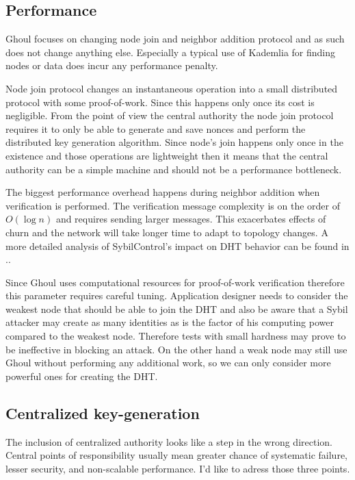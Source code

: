   \subsection{Performance}

  Ghoul focuses on changing node join and neighbor addition protocol and as
  such does not change anything else. Especially a typical use of Kademlia for
  finding nodes or data does incur any performance penalty.

  Node join protocol changes an instantaneous operation into a small distributed
  protocol with some proof-of-work. Since this happens only once its cost is
  negligible. From the point of view the central authority the node join
  protocol requires it to only be able to generate and save nonces and perform
  the distributed key generation algorithm. Since node's join happens only once
  in the existence and those operations are lightweight then it means that the
  central authority can be a simple machine and should not be a performance
  bottleneck.

  The biggest performance overhead happens during neighbor addition when
  verification is performed. The verification message complexity is on the order
  of $O(\log n)$ and requires sending larger messages. This exacerbates effects
  of churn and the network will take longer time to adapt to topology changes.
  A more detailed analysis of SybilControl's impact on DHT behavior can be
  found in \cite{li12}..

  Since Ghoul uses computational resources for proof-of-work verification
  therefore this parameter requires careful tuning. Application designer needs
  to consider the weakest node that should be able to join the DHT and also be
  aware that a Sybil attacker may create as many identities as is the factor
  of his computing power compared to the weakest node. Therefore tests with
  small hardness may prove to be ineffective in blocking an attack. On the other
  hand a weak node may still use Ghoul without performing any additional work,
  so we can only consider more powerful ones for creating the DHT.

  \subsection{Centralized key-generation}
  
  The inclusion of centralized authority looks like a step in the wrong
  direction. Central points of responsibility usually mean greater chance of
  systematic failure, lesser security, and non-scalable performance. I'd like to
  adress those three points.

